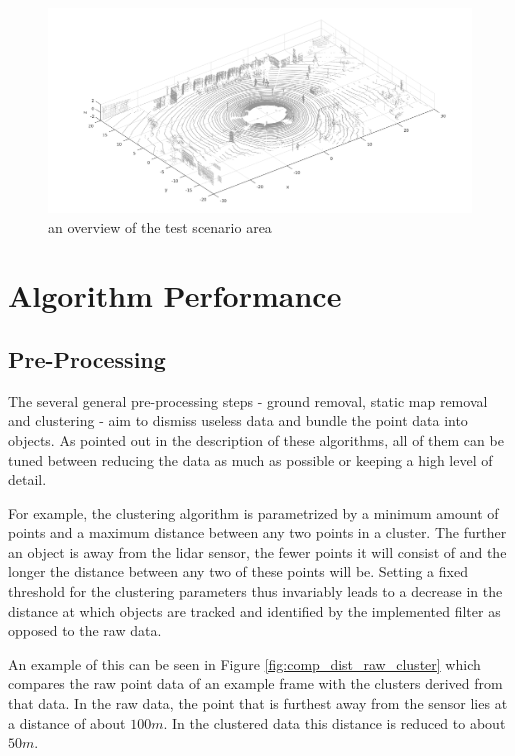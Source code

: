 \begin{figure}[H]
\centering
\includegraphics[width = \textwidth]{include/images/results_scenario_overview.png}
\caption{an overview of the test scenario area}
\label{fig:scenario_overview}
\end{figure}

\section{Algorithm Performance}
\subsection{Pre-Processing}
The several general pre-processing steps - ground removal, static map removal and clustering - aim to dismiss useless data and bundle the point data into objects. As pointed out in the description of these algorithms, all of them can be tuned between reducing the data as much as possible or keeping a high level of detail. 

For example, the clustering algorithm is parametrized by a minimum amount of points and a maximum distance between any two points in a cluster. The further an object is away from the lidar sensor, the fewer points it will consist of and the longer the distance between any two of these points will be. Setting a fixed threshold for the clustering parameters thus invariably leads to a decrease in the distance at which objects are tracked and identified by the implemented filter as opposed to the raw data.

An example of this can be seen in Figure \ref{fig:comp_dist_raw_cluster} which compares the raw point data of an example frame with the clusters derived from that data. In the raw data, the point that is furthest away from the sensor lies at a distance of about $100m$. In the clustered data this distance is reduced to about $50m$.

